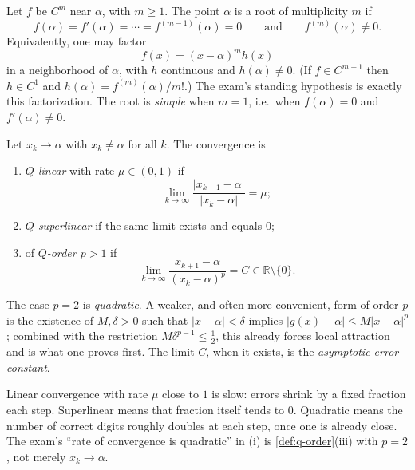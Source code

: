 \begin{definition}[Multiplicity]
\label{def:multiplicity}
Let \(f\) be \(C^m\) near \(\alpha\), with \(m\ge 1\). The point \(\alpha\) is a root of multiplicity \(m\) if
\[
f(\alpha)
=
f'(\alpha)
=
\cdots
=
f^{(m-1)}(\alpha)
=
0
\qquad\text{and}\qquad
f^{(m)}(\alpha)\neq 0.
\]
Equivalently, one may factor
\[
f(x)
=
(x-\alpha)^m h(x)
\]
in a neighborhood of \(\alpha\), with \(h\) continuous and \(h(\alpha)\neq 0\). (If \(f\in C^{m+1}\) then \(h\in C^1\) and \(h(\alpha)=f^{(m)}(\alpha)/m!\).) The exam's standing hypothesis is exactly this factorization. The root is \emph{simple} when \(m=1\), i.e.\ when \(f(\alpha)=0\) and \(f'(\alpha)\neq 0\).
\end{definition}

\begin{definition}
\label{def:q-order}
Let \(x_k\to\alpha\) with \(x_k\neq\alpha\) for all \(k\). The convergence is
\begin{enumerate}[label=\textup{(\roman*)}]
    \item \emph{\(Q\)-linear} with rate \(\mu\in(0,1)\) if
    \[
    \lim_{k\to\infty}
    \frac{\lvert x_{k+1}-\alpha\rvert}{\lvert x_k-\alpha\rvert}
    =
    \mu;
    \]
    \item \emph{\(Q\)-superlinear} if the same limit exists and equals \(0\);
    \item of \emph{\(Q\)-order \(p>1\)} if
    \[
    \lim_{k\to\infty}
    \frac{x_{k+1}-\alpha}{(x_k-\alpha)^p}
    =
    C
    \in\mathbb{R}\setminus\{0\}.
    \]
\end{enumerate}
The case \(p=2\) is \emph{quadratic}. A weaker, and often more convenient, form of order \(p\) is the existence of \(M,\delta>0\) such that \(\lvert x-\alpha\rvert<\delta\) implies \(\lvert g(x)-\alpha\rvert\le M\lvert x-\alpha\rvert^p\); combined with the restriction \(M\delta^{p-1}\le\tfrac12\), this already forces local attraction and is what one proves first. The limit \(C\), when it exists, is the \emph{asymptotic error constant}.
\end{definition}

Linear convergence with rate \(\mu\) close to \(1\) is slow: errors shrink by a fixed fraction each step. Superlinear means that fraction itself tends to \(0\). Quadratic means the number of correct digits roughly doubles at each step, once one is already close. The exam's ``rate of convergence is quadratic'' in (i) is \cref{def:q-order}(iii) with \(p=2\), not merely \(x_k\to\alpha\).

